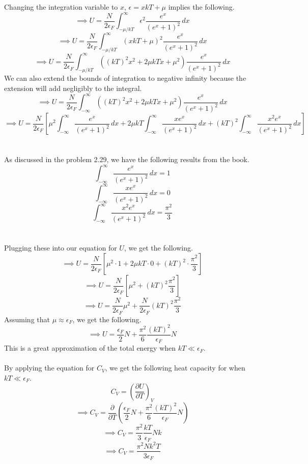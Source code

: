 \documentclass[12pt]{article}
\newcommand{\partDeriv}[2]{\frac{\partial #1}{\partial #2}}
\begin{document}
\begin{flushleft}
Changing the integration variable to $x$, $\epsilon=xkT+\mu$ implies the following.
$$\implies U=\frac{N}{2\epsilon_F}\int_{-\mu/kT}^\infty\epsilon^2\frac{e^x}{(e^x+1)^2}\,dx$$
$$\implies U=\frac{N}{2\epsilon_F}\int_{-\mu/kT}^\infty(xkT+\mu)^2\frac{e^x}{(e^x+1)^2}\,dx$$
$$\implies U=\frac{N}{2\epsilon_F}\int_{-\mu/kT}^\infty((kT)^2x^2+2\mu kTx+\mu^2)\frac{e^x}{(e^x+1)^2}\,dx$$
We can also extend the bounds of integration to negative infinity because the extension will add negligibly to the integral.
$$\implies U=\frac{N}{2\epsilon_F}\int_{-\infty}^\infty((kT)^2x^2+2\mu kTx+\mu^2)\frac{e^x}{(e^x+1)^2}\,dx$$
$$\implies U=\frac{N}{2\epsilon_F}\left[\mu^2\int_{-\infty}^\infty\frac{e^x}{(e^x+1)^2}\,dx+2\mu kT\int_{-\infty}^\infty\frac{xe^x}{(e^x+1)^2}\,dx+(kT)^2\int_{-\infty}^\infty\frac{x^2e^x}{(e^x+1)^2}\,dx\right]$$\\~\\

As discussed in the problem 2.29, we have the following results from the book.
$$\int_{-\infty}^\infty\frac{e^x}{(e^x+1)^2}\,dx=1$$
$$\int_{-\infty}^\infty\frac{xe^x}{(e^x+1)^2}\,dx=0$$
$$\int_{-\infty}^\infty\frac{x^2e^x}{(e^x+1)^2}\,dx=\frac{\pi^2}{3}$$\\~\\

Plugging these into our equation for $U$, we get the following.
$$\implies U=\frac{N}{2\epsilon_F}\left[\mu^2\cdot1+2\mu kT\cdot0+(kT)^2\cdot\frac{\pi^2}{3}\right]$$
$$\implies U=\frac{N}{2\epsilon_F}\left[\mu^2+(kT)^2\frac{\pi^2}{3}\right]$$
$$\implies U=\frac{N}{2\epsilon_F}\mu^2+\frac{N}{2\epsilon_F}(kT)^2\frac{\pi^2}{3}$$
Assuming that $\mu\approx\epsilon_F$, we get the following.
$$\implies U=\frac{\epsilon_F}{2}N+\frac{\pi^2}{6}\frac{(kT)^2}{\epsilon_F}N$$
This is a great approximation of the total energy when $kT\ll\epsilon_F$.\\~\\

By applying the equation for $C_V$, we get the following heat capacity for when $kT\ll\epsilon_F$.
$$C_V=\left(\partDeriv{U}{T}\right)_V$$
$$\implies C_V=\partDeriv{}{T}\left(\frac{\epsilon_F}{2}N+\frac{\pi^2}{6}\frac{(kT)^2}{\epsilon_F}N\right)$$
$$\implies C_V=\frac{\pi^2}{3}\frac{kT}{\epsilon_F}Nk$$
$$\implies C_V=\frac{\pi^2Nk^2T}{3\epsilon_F}$$\\~\\


\end{flushleft}
\end{document}
